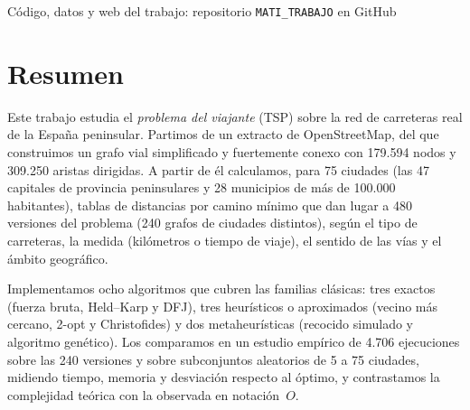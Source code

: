 \begin{titlepage}
  \thispagestyle{empty}
  \centering
  \vspace*{2.2cm}
  {\large\scshape\color{gris}\asignatura\par}
  \vspace{2.4cm}
  {\fontsize{26}{32}\selectfont\bfseries\color{tinta}\titulotrabajo\par}
  \vspace{1.0cm}
  {\large\itshape\color{gris}\subtitulotrabajo\par}
  \vspace{2.2cm}
  \vspace{2.4cm}

  {\Large\autorestrabajo\par}
  \vfill
  {\large\fechatrabajo\par}
  \vspace{1.0cm}
  {\small\color{gris}Código, datos y web del trabajo: repositorio \texttt{MATI\_TRABAJO} en GitHub\par}
\end{titlepage}

\chapter*{Resumen}
Este trabajo estudia el \emph{problema del viajante} (TSP) sobre la red de carreteras real de la España peninsular. Partimos de un
extracto de OpenStreetMap, del que construimos un grafo vial simplificado y fuertemente conexo con 179.594 nodos y 309.250 aristas dirigidas.
A partir de él calculamos, para 75 ciudades (las 47 capitales de provincia peninsulares y 28 municipios de más de 100.000 habitantes),
tablas de distancias por camino mínimo que dan lugar a 480 versiones del problema (240 grafos de ciudades distintos), según el tipo de carreteras,
la medida (kilómetros o tiempo de viaje), el sentido de las vías y el ámbito geográfico.

Implementamos ocho algoritmos que cubren las familias clásicas: tres exactos (fuerza bruta, Held--Karp y DFJ), tres heurísticos o aproximados (vecino más
cercano, 2-opt y Christofides) y dos metaheurísticas (recocido simulado y algoritmo genético). Los comparamos en un estudio empírico de
4.706 ejecuciones sobre las 240 versiones y sobre subconjuntos aleatorios de 5 a 75 ciudades, midiendo tiempo, memoria y desviación respecto al óptimo,
y contrastamos la complejidad teórica con la observada en notación~$O$.

